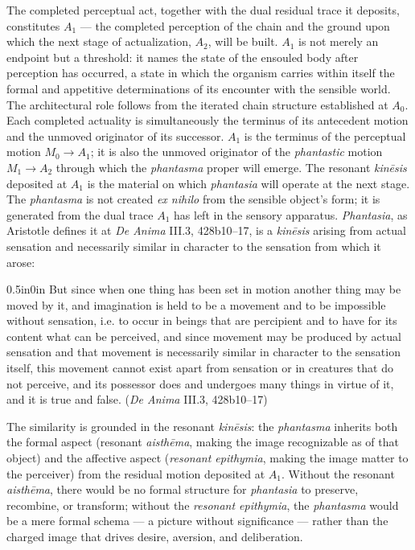 \documentclass{article}
\begin{document}
The completed perceptual act, together with the dual residual trace it deposits, constitutes $A_1$ --- the completed perception of the chain and the ground upon which the next stage of actualization, $A_2$, will be built. $A_1$ is not merely an endpoint but a threshold: it names the state of the ensouled body after perception has occurred, a state in which the organism carries within itself the formal and appetitive determinations of its encounter with the sensible world. The architectural role follows from the iterated chain structure established at $A_0$. Each completed actuality is simultaneously the terminus of its antecedent motion and the unmoved originator of its successor. $A_1$ is the terminus of the perceptual motion $M_0 \rightarrow A_1$; it is also the unmoved originator of the \textit{phantastic} motion $M_1 \rightarrow A_2$ through which the \textit{phantasma} proper will emerge. The resonant \textit{kinēsis} deposited at $A_1$ is the material on which \textit{phantasia} will operate at the next stage. The \textit{phantasma} is not created \textit{ex nihilo} from the sensible object's form; it is generated from the dual trace $A_1$ has left in the sensory apparatus. \textit{Phantasia}, as Aristotle defines it at \textit{De Anima} III.3, 428b10--17, is a \textit{kinēsis} arising from actual sensation and necessarily similar in character to the sensation from which it arose:
\begin{adjustwidth}{0.5in}{0in}
But since when one thing has been set in motion another thing may be moved by it, and imagination is held to be a movement and to be impossible without sensation, i.e. to occur in beings that are percipient and to have for its content what can be perceived, and since movement may be produced by actual sensation and that movement is necessarily similar in character to the sensation itself, this movement cannot exist apart from sensation or in creatures that do not perceive, and its possessor does and undergoes many things in virtue of it, and it is true and false. (\textit{De Anima} III.3, 428b10--17)
\end{adjustwidth}
The similarity is grounded in the resonant \textit{kinēsis}: the \textit{phantasma} inherits both the formal aspect (resonant \textit{aisthēma}, making the image recognizable as of that object) and the affective aspect (\textit{resonant epithymia}, making the image matter to the perceiver) from the residual motion deposited at $A_1$. Without the resonant \textit{aisthēma}, there would be no formal structure for \textit{phantasia} to preserve, recombine, or transform; without the \textit{resonant epithymia}, the \textit{phantasma} would be a mere formal schema --- a picture without significance --- rather than the charged image that drives desire, aversion, and deliberation.
\end{document}
